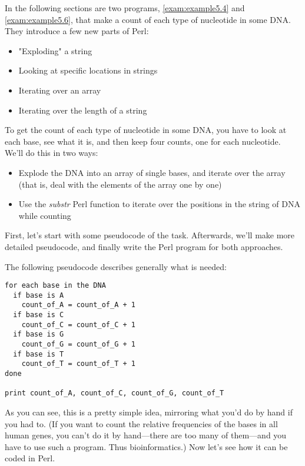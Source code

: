 In the following sections are two programs, \autoref{exam:example5.4} and \autoref{exam:example5.6}, that make a count of each type of nucleotide in some DNA. They introduce a few new parts of Perl:

\begin{itemize}
  \item "Exploding" a string
  \item Looking at specific locations in strings
  \item Iterating over an array
  \item Iterating over the length of a string
\end{itemize}

To get the count of each type of nucleotide in some DNA, you have to look at each base, see what it is, and then keep four counts, one for each nucleotide. We'll do this in two ways:

\begin{itemize}
  \item Explode the DNA into an array of single bases, and iterate over the array (that is, deal with the elements of the array one by one)
  \item Use the \textit{substr} Perl function to iterate over the positions in the string of DNA while counting
\end{itemize}

First, let's start with some pseudocode of the task. Afterwards, we'll make more detailed pseudocode, and finally write the Perl program for both approaches.

The following pseudocode describes generally what is needed:

\begin{lstlisting}
for each base in the DNA
  if base is A
    count_of_A = count_of_A + 1
  if base is C
    count_of_C = count_of_C + 1
  if base is G
    count_of_G = count_of_G + 1
  if base is T
    count_of_T = count_of_T + 1
done

print count_of_A, count_of_C, count_of_G, count_of_T
\end{lstlisting}

As you can see, this is a pretty simple idea, mirroring what you'd do by hand if you had to. (If you want to count the relative frequencies of the bases in all human genes, you can't do it by hand—there are too many of them—and you have to use such a program. Thus bioinformatics.) Now let's see how it can be coded in Perl. 

